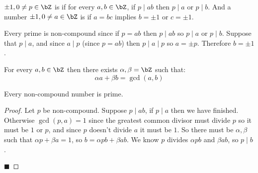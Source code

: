 \documentclass[10pt]{article}
\let\divides=\mid
\begin{document}
\begin{defn*}

    $\pm1,0\neq p\in\bZ$ is  if for every $a,b\in\bZ$, if $p\divides ab$ then $p\divides a$ or $p\divides b$.
    And a number $\pm1,0\neq a\in\bZ$ is  if $a=bc$ implies $b=\pm 1$ or $c=\pm 1$.

\end{defn*}

Every prime is non-compound since if $p=ab$ then $p\divides ab$ so $p\divides a$ or $p\divides b$.
Suppose that $p\divides a$, and since $a\divides p$ (since $p=ab$) then $p\divides a\divides p$ so $a=\pm p$.
Therefore $b=\pm1$.

\begin{thrm*}

    For every $a,b\in\bZ$ then there exists $\alpha,\beta=\bZ$ such that:
        \[ \alpha a + \beta b = \gcd(a,b) \]

\end{thrm*}

\begin{prop*}

    Every non-compound number is prime.

\end{prop*}

\begin{proof}

    Let $p$ be non-compound.
    Suppose $p\divides ab$, if $p\divides a$ then we have finished.
    Otherwise $\gcd(p,a)=1$ since the greatest common divisor must divide $p$ so it must be $1$ or $p$, and since $p$ doesn't divide $a$ it must be $1$.
    So there must be $\alpha,\beta$ such that $\alpha p + \beta a = 1$, so $b=\alpha pb + \beta ab$.
    We know $p$ divides $\alpha pb$ and $\beta ab$, so $p\divides b$.

    \hfill$\blacksquare$

\end{proof}
\end{document}
